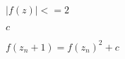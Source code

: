 \documentclass{article}
\begin{document}
$|f(z)|<=2$
\pagebreak

$c$
\pagebreak

$f(z_n+1) = f(z_n)^2 + c$
\pagebreak
\end{document}

